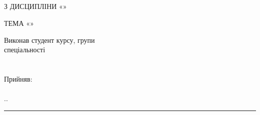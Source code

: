 \newpage

\begin{center}
    \MakeUppercase{\theUniversityMinistry}\\
    \MakeUppercase{\theUniversityName}\\
    \MakeUppercase{\theAuthorDepartment}\\
    
    \vspace{42 pt}
    

    \MakeUppercase{\theWorkType}\\
    \MakeUppercase{З дисципліни «\theWorkDiscipline»}\\
    
    \vspace{21 pt}
    
    \MakeUppercase{Тема «\theWorkSubject»}\\
\end{center}

\vfill

\begin{multicols}{2}
    \vfill\null
    \columnbreak

    \noindent Виконав студент \theAuthorCourceNumber курсу, групи \theAuthorGroup\\
    спеціальності\\
    \theAuthorSpecialization\\
    \theAuthorSurname~\theAuthorName~\theAuthorFatherName\\
    Прийняв:\\
    \theProfessorDegree \\
    \theProfessorFirstLetterName.\theProfessorFirstLetterFatherName.~\theProfessorSurname~\rule{1cm}{1pt}
\end{multicols}

\vfill

\begin{center}
    \theUniversityCity~\theWorkYear
\end{center}

\newpage